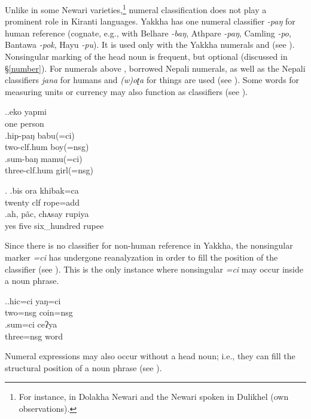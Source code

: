 Unlike in some Newari varieties,\footnote{For instance, in Dolakha Newari \citep[220]{Genetti2007_Newari} and the Newari spoken in Dulikhel (own observations).} numeral classification does not play a prominent role in Kiranti languages. Yakkha has one numeral classifier \emph{-paŋ} for human reference (cognate, e.g., with Belhare \emph{-baŋ}, Athpare \emph{-paŋ}, Camling \emph{-po}, Bantawa \emph{-pok}, Hayu \emph{-pu}). It is  used only with the Yakkha numerals  and   (see \Next).  Nonsingular marking of the head noun is frequent, but optional (discussed in  §\ref{number}). For numerals above ,  borrowed Nepali numerals, as well as the Nepali classifiers \emph{jana} for humans and \emph{(w)oʈa} for things are used (see \NNext[a]). Some words for measuring units or currency may also function as classifiers (see \NNext[b]).  

\ex.\ag.eko yapmi\\
one person\\
\bg.hip-paŋ babu(=ci)\\
two{\sc -clf.hum} boy({\sc =nsg})\\
\bg.sum-baŋ mamu(=ci)\\
three{\sc -clf.hum} girl({\sc =nsg})\\

\ex. \ag.bis ora  khibak=ca\\
twenty {\sc clf}  rope{\sc =add}\\
 
\bg.ah,    pãc, chʌsay     rupiya\\
yes five six\_hundred rupee\\
 

Since there is no classifier for non-human reference in Yakkha, the nonsingular marker \emph{=ci} has undergone reanalyzation in order to fill the  position of the classifier (see \Next). This is the only instance where nonsingular \emph{=ci} may occur inside a noun phrase. 

\ex.\ag.hic=ci yaŋ=ci\\
two{\sc =nsg} coin{\sc =nsg}\\
  
\bg.sum=ci ceʔya\\
three{\sc =nsg} word\\
  

Numeral expressions may also occur without a head noun; i.e., they can fill the structural position of a noun phrase (see \Next).

